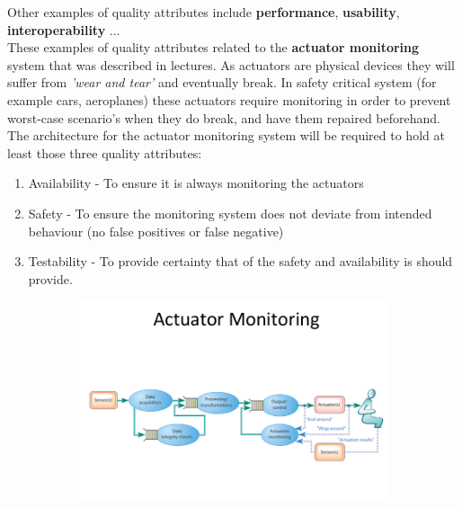 \documentclass[a4paper]{article}
\begin{document}
Other examples of quality attributes include \textbf{performance}, \textbf{usability}, \textbf{interoperability} ...\\

These examples of quality attributes related to the \textbf{actuator monitoring} system that was described in lectures. As actuators are physical devices they will suffer from \textit{'wear and tear'} and eventually break. In safety critical system (for example cars, aeroplanes) these actuators require monitoring in order to prevent worst-case scenario's when they do break, and have them repaired beforehand.\\

The architecture for the actuator monitoring system will be required to hold at least those three quality attributes:
\begin{enumerate}
\item Availability - To ensure it is always monitoring the actuators
\item Safety - To ensure the monitoring system does not deviate from intended behaviour (no false positives or false negative)
\item Testability - To provide certainty that of the safety and availability is should provide.
\end{enumerate}

\begin{figure}[H]
\centering
\begin{subfigure}{1\textwidth}
  \includegraphics[width=1\linewidth]
  {images/3-actuator-monitoring-architecture.png}
\end{subfigure}
\end{figure}
\end{document}

